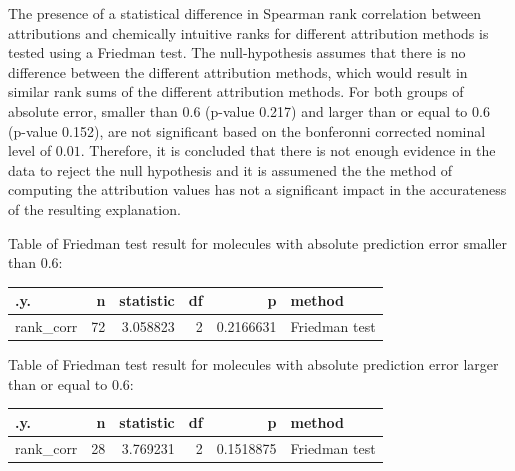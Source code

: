 \documentclass[
  12pt,
  a4paper]{article}
\begin{document}
The presence of a statistical difference in Spearman rank correlation
between attributions and chemically intuitive ranks for different
attribution methods is tested using a Friedman test. The null-hypothesis
assumes that there is no difference between the different attribution
methods, which would result in similar rank sums of the different
attribution methods. For both groups of absolute error, smaller than
\(0.6\) (p-value 0.217) and larger than or equal to \(0.6\) (p-value
0.152), are not significant based on the bonferonni corrected nominal
level of \(0.01\). Therefore, it is concluded that there is not enough
evidence in the data to reject the null hypothesis and it is assumened
the the method of computing the attribution values has not a significant
impact in the accurateness of the resulting explanation.

Table of Friedman test result for molecules with absolute prediction
error smaller than \(0.6\):

\begin{longtable}[]{@{}lrrrrl@{}}
\toprule\noalign{}
.y. & n & statistic & df & p & method \\
\midrule\noalign{}
\endhead
\bottomrule\noalign{}
\endlastfoot
rank\_corr & 72 & 3.058823 & 2 & 0.2166631 & Friedman test \\
\end{longtable}

Table of Friedman test result for molecules with absolute prediction
error larger than or equal to \(0.6\):

\begin{longtable}[]{@{}lrrrrl@{}}
\toprule\noalign{}
.y. & n & statistic & df & p & method \\
\midrule\noalign{}
\endhead
\bottomrule\noalign{}
\endlastfoot
rank\_corr & 28 & 3.769231 & 2 & 0.1518875 & Friedman test \\
\end{longtable}
\end{document}
